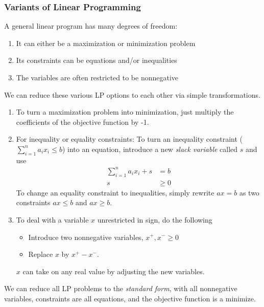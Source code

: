 \subsubsection{Variants of Linear Programming}
A general linear program has many degrees of freedom:
\begin{enumerate}
  \item It can either be a maximization or minimization problem
  \item Its constraints can be equations and/or inequalities
  \item The variables are often restricted to be nonnegative
\end{enumerate}
We can reduce these various LP options to each other via simple transformations.
\begin{enumerate}
  \item To turn a maximization problem into minimization, just multiply the coefficients of the objective function by -1.
  \item For inequality or equality constraints:
    \subitem To turn an inequality constraint ($\sum_{i=1}^n a_i x_i \leq b$) into an equation, introduce a new \textit{slack variable} called $s$ and use
      \begin{align*}
        \sum_{i=1}^n a_i x_i + s &= b\\
        s & \geq 0
      \end{align*}
    \subitem To change an equality constraint to inequalities, simply rewrite $ax = b$ as two constraints $ax \leq b$ and $ax \geq b$.
  \item To deal with a variable $x$ unrestricted in sign, do the following
    \begin{itemize}
      \item Introduce two nonnegative variables, $x^+, x^- \geq 0$
      \item Replace $x$ by $x^+ - x^-$.
    \end{itemize}
    $x$ can take on any real value by adjusting the new variables.
\end{enumerate}
We can reduce all LP problems to the \textit{standard form}, with all nonnegative variables, constraints are all equations, and the objective function is a minimize.

